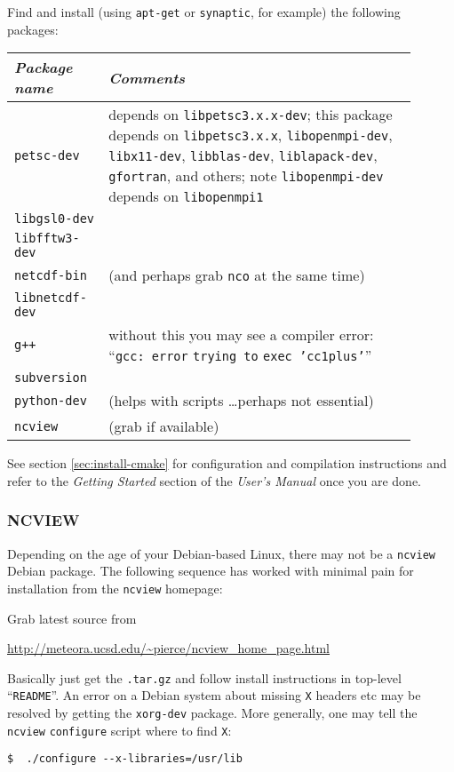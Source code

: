 \documentclass[11pt,final]{amsart}
\begin{document}
Find and install (using \texttt{apt-get} or \texttt{synaptic}, for example) the following packages:
  \begin{center}
    \begin{tabular*}{0.9\linewidth}{p{0.2\linewidth}p{0.7\linewidth}}
      \toprule
      \emph{Package name} & \emph{Comments}\\
      \midrule
      \texttt{petsc-dev} & depends on \texttt{libpetsc3.x.x-dev}; this package 
      depends on \texttt{libpetsc3.x.x}, \texttt{libopenmpi-dev}, \texttt{libx11-dev},
      \texttt{libblas-dev}, \texttt{liblapack-dev}, \texttt{gfortran}, and others; 
      note \texttt{libopenmpi-dev} depends on \texttt{libopenmpi1}\\
      \texttt{libgsl0-dev} & \\
      \texttt{libfftw3-dev} & \\
      \texttt{netcdf-bin} & (and perhaps grab \texttt{nco} at the same time)\\
      \texttt{libnetcdf-dev} & \\
      \texttt{g++} & without this you may see a compiler error: ``\texttt{gcc: error} \texttt{trying to} \texttt{exec 'cc1plus'}''\\
      \texttt{subversion} & \\
      \texttt{python-dev} & (helps with scripts \dots perhaps not essential) \\
      \texttt{ncview} & (grab if available) \\
      \bottomrule
    \end{tabular*}
  \end{center}

See section \ref{sec:install-cmake} for configuration and compilation instructions and refer to the \emph{Getting Started} section
of the \emph{User's Manual} once you are done.

\vspace{0.3in}

\subsubsection*{NCVIEW}  Depending on the age of your Debian-based Linux, there may not be a \texttt{ncview} Debian package.  The following sequence has worked with minimal pain for installation from the \texttt{ncview} homepage:

Grab latest source from
\begin{center}
  \url{http://meteora.ucsd.edu/~pierce/ncview_home_page.html}
\end{center}
Basically just get the \texttt{.tar.gz} and follow install instructions in top-level ``\texttt{README}''.  An error on a Debian system about missing \texttt{X} headers etc may be resolved by getting the \texttt{xorg-dev} package.  More generally, one may tell the \texttt{ncview} \texttt{configure} script where to find \texttt{X}:
\begin{verbatim}
$  ./configure --x-libraries=/usr/lib
\end{verbatim}
\end{document}
